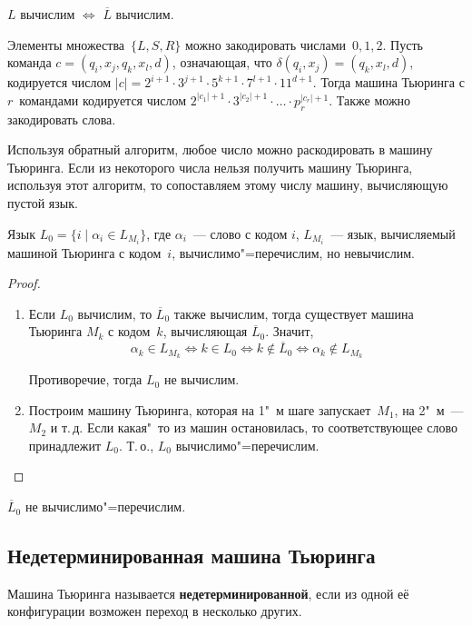 \begin{statement}
$L$ вычислим $\Leftrightarrow$ $\overline L$ вычислим.
\end{statement}

Элементы множества~$\{ L, S, R \}$ можно закодировать числами~$0, 1, 2$.
Пусть команда $c = (q_i, x_j, q_k, x_l, d)$, означающая, что $\delta(q_i, x_j) = (q_k, x_l, d)$, кодируется числом $|c| = 2^{i+1} \cdot 3^{j+1} \cdot 5^{k+1} \cdot 7^{l+1} \cdot 11^{d+1}$.
Тогда машина Тьюринга с $r$~командами кодируется числом $2^{|c_1| + 1} \cdot 3^{|c_2| + 1} \cdot \ldots \cdot p_r^{|c_r| + 1}$.
Также можно закодировать слова.

Используя обратный алгоритм, любое число можно раскодировать в машину Тьюринга.
Если из некоторого числа нельзя получить машину Тьюринга, используя этот алгоритм, то сопоставляем этому числу машину, вычисляющую пустой язык.

\begin{theorem}
Язык $L_0 = \{ i \mid \alpha_i \in L_{M_i} \}$, где $\alpha_i$~--- слово с кодом $i$, $L_{M_i}$~--- язык, вычисляемый машиной Тьюринга с кодом~$i$, вычислимо"=перечислим, но невычислим.
\end{theorem}
\begin{proof}
\begin{enumerate}
	\item Если $L_0$ вычислим, то $\overline L_0$ также вычислим, тогда существует машина Тьюринга $M_k$ с кодом~$k$, вычисляющая $\overline L_0$.
	Значит,
	\begin{equation*}
	\alpha_k \in L_{M_k} \Leftrightarrow
	k \in L_0 \Leftrightarrow
	k \notin \overline L_0 \Leftrightarrow
	\alpha_k \notin L_{M_k}
	\end{equation*}
	
	Противоречие, тогда $L_0$ не вычислим.
	
	\item Построим машину Тьюринга, которая на 1"~м шаге запускает~$M_1$, на 2"~м~--- $M_2$ и т.\,д.
	Если какая"~то из машин остановилась, то соответствующее слово принадлежит $L_0$.
	Т.\,о., $L_0$ вычислимо"=перечислим.
\end{enumerate}
\end{proof}

\begin{consequent}
$\overline L_0$ не вычислимо"=перечислим.
\end{consequent}

\subsection{Недетерминированная машина Тьюринга}
 Машина Тьюринга называется \textbf{недетерминированной}, если из одной её конфигурации возможен переход в несколько других.

